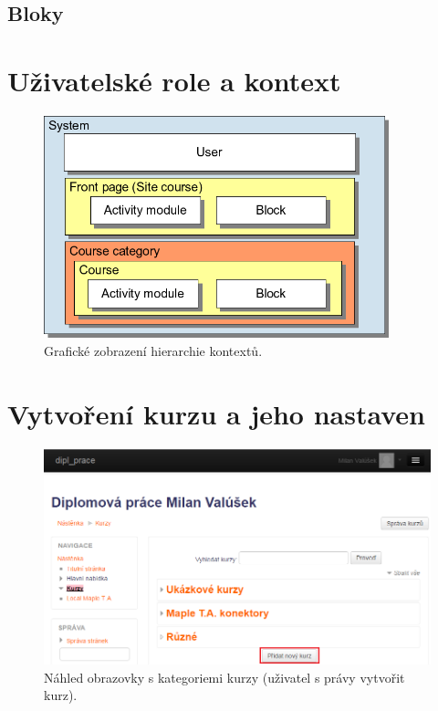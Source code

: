 \documentclass[
print,
  11pt,
  table,   
  nolof,    
  nolot,
  oneside,
  final
]{fithesis3}
\begin{document}
		\subsection{Bloky}
	\section{Uživatelské role a kontext}

		\begin{figure}
		  \begin{center}
		    \includegraphics[width=100mm]{images/moodle-context.png}
		   \end{center}
		  \caption{Grafické zobrazení hierarchie kontextů.   \cite{moodle-context}}
		  \label{fig:moodlecontext}
		\end{figure}

	\section{Vytvoření kurzu a jeho nastaven}

		\begin{figure}
		  \begin{center}
		    \includegraphics[width=120mm]{images/kurzy-pridani.png}
		   \end{center}
		  \caption{Náhled obrazovky s kategoriemi kurzy (uživatel s právy vytvořit kurz).  }
		  \label{fig:moodlekurzypridani}
		\end{figure}
\end{document}
